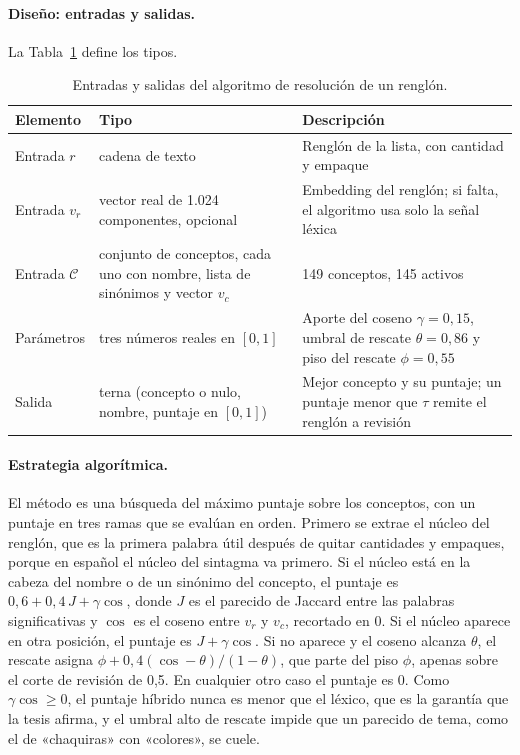 \paragraph{Diseño: entradas y salidas.} La Tabla~\ref{tab:es-resolucion} define los tipos.

\begin{table}[H]
\centering\footnotesize
\caption{Entradas y salidas del algoritmo de resolución de un renglón.}
\label{tab:es-resolucion}
\begin{tabularx}{\textwidth}{@{}p{2.6cm}p{3.6cm}X@{}}
\toprule
Elemento & Tipo & Descripción \\
\midrule
Entrada $r$ & cadena de texto & Renglón de la lista, con cantidad y empaque \\
Entrada $v_r$ & vector real de 1.024 componentes, opcional & Embedding del renglón; si falta, el algoritmo usa solo la señal léxica \\
Entrada $\mathcal{C}$ & conjunto de conceptos, cada uno con nombre, lista de sinónimos y vector $v_c$ & 149 conceptos, 145 activos \\
Parámetros & tres números reales en $[0,1]$ & Aporte del coseno $\gamma=0{,}15$, umbral de rescate $\theta=0{,}86$ y piso del rescate $\phi=0{,}55$ \\
Salida & terna (concepto o nulo, nombre, puntaje en $[0,1]$) & Mejor concepto y su puntaje; un puntaje menor que $\tau$ remite el renglón a revisión \\
\bottomrule
\end{tabularx}
\end{table}

\paragraph{Estrategia algorítmica.} El método es una búsqueda del máximo puntaje sobre los
conceptos, con un puntaje en tres ramas que se evalúan en orden. Primero se extrae el núcleo del
renglón, que es la primera palabra útil después de quitar cantidades y empaques, porque en español
el núcleo del sintagma va primero. Si el núcleo está en la cabeza del nombre o de un sinónimo del
concepto, el puntaje es $0{,}6+0{,}4\,J+\gamma\cos$, donde $J$ es el parecido de Jaccard entre las
palabras significativas y $\cos$ es el coseno entre $v_r$ y $v_c$, recortado en 0. Si el núcleo
aparece en otra posición, el puntaje es $J+\gamma\cos$. Si no aparece y el coseno alcanza $\theta$, el
rescate asigna $\phi+0{,}4(\cos-\theta)/(1-\theta)$, que parte del piso $\phi$, apenas sobre el corte de revisión de
0,5. En cualquier otro caso el puntaje es 0. Como $\gamma\cos\ge 0$, el puntaje híbrido nunca es
menor que el léxico, que es la garantía que la tesis afirma, y el umbral alto de rescate impide que
un parecido de tema, como el de «chaquiras» con «colores», se cuele.

